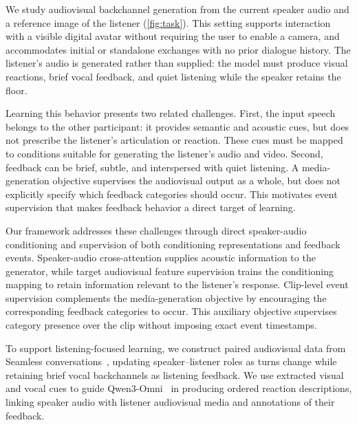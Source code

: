 We study audiovisual backchannel generation from the current speaker audio
and a reference image of the listener (\cref{fig:task}). This setting
supports interaction with a visible digital avatar without requiring the
user to enable a camera, and accommodates initial or standalone exchanges
with no prior dialogue history. 
The listener's audio is generated rather than supplied: the model must
produce visual reactions, brief vocal feedback, and quiet listening while
the speaker retains the floor.

Learning this behavior presents two related challenges. First, the input
speech belongs to the other participant: it provides semantic and acoustic
cues, but does not prescribe the listener's articulation or reaction.
These cues must be mapped to conditions suitable for generating the
listener's audio and video. Second, feedback can be brief, subtle, and
interspersed with quiet listening. A media-generation objective supervises
the audiovisual output as a whole, but does not explicitly specify which
feedback categories should occur. This motivates event supervision that
makes feedback behavior a direct target of learning.

Our framework addresses these challenges through direct speaker-audio
conditioning and supervision of both conditioning representations and
feedback events. Speaker-audio cross-attention supplies acoustic
information to the generator, while target audiovisual feature supervision
trains the conditioning mapping to retain information relevant to the
listener's response. Clip-level event supervision complements the
media-generation objective by encouraging the corresponding feedback
categories to occur. This auxiliary objective supervises category presence
over the clip without imposing exact event timestamps.

To support listening-focused learning, we construct paired
audiovisual data from Seamless conversations~\cite{seamless},
updating speaker--listener roles as turns change while retaining
brief vocal backchannels as listening feedback. We use extracted
visual and vocal cues to guide Qwen3-Omni~\cite{qwen3omni} in
producing ordered reaction descriptions, linking speaker audio
with listener audiovisual media and annotations of their feedback.

